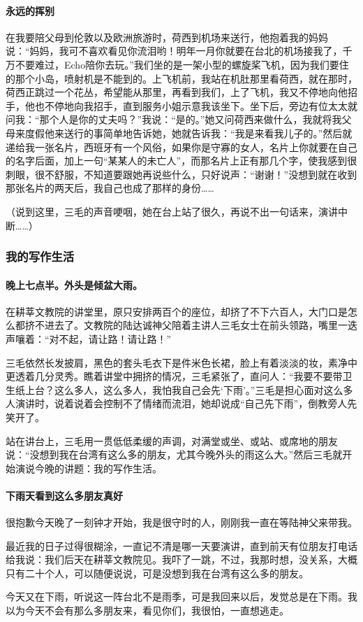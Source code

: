 \paragraph{永远的挥别}
\par 在我要陪父母到伦敦以及欧洲旅游时，荷西到机场来送行，他抱着我的妈妈说：“妈妈，我可不喜欢看见你流泪哟！明年一月你就要在台北的机场接我了，千万不要难过，Echo陪你去玩。”我们坐的是一架小型的螺旋桨飞机，因为我们要住的那个小岛，喷射机是不能到的。上飞机前，我站在机肚那里看荷西，就在那时，荷西正跳过一个花丛，希望能从那里，再看到我们，上了飞机，我又不停地向他招手，他也不停地向我招手，直到服务小姐示意我该坐下。坐下后，旁边有位太太就问我：“那个人是你的丈夫吗？”我说：“是的。”她又问荷西来做什么，我就将我父母来度假他来送行的事简单地告诉她，她就告诉我：“我是来看我儿子的。”然后就递给我一张名片，西班牙有一个风俗，如果你是守寡的女人，名片上你就要在自己的名字后面，加上一句“某某人的未亡人”，而那名片上正有那几个字，使我感到很刺眼，很不舒服，不知道要跟她再说些什么，只好说声：“谢谢！”没想到就在收到那张名片的两天后，我自己也成了那样的身份……
\par （说到这里，三毛的声音哽咽，她在台上站了很久，再说不出一句话来，演讲中断……）


\subsubsection{我的写作生活}


\paragraph*{晚上七点半。外头是倾盆大雨。}
\par 在耕莘文教院的讲堂里，原只安排两百个的座位，却挤了不下六百人，大门口是怎么都挤不进去了。文教院的陆达诚神父陪着主讲人三毛女士在前头领路，嘴里一迭声嚷着：“对不起，请让路！请让路！”
\par 三毛依然长发披肩，黑色的套头毛衣下是件米色长裙，脸上有着淡淡的妆，素净中更透着几分灵秀。瞧着讲堂中拥挤的情况，三毛紧张了，直问人：“我要不要带卫生纸上台？这么多人，这么多人，我怕我自己会先‘下雨’。”三毛是担心面对这么多人演讲时，说着说着会控制不了情绪而流泪，她却说成“自己先下雨”，倒教旁人先笑开了。
\par 站在讲台上，三毛用一贯低低柔缓的声调，对满堂或坐、或站、或席地的朋友说：“没想到我在台湾有这么多的朋友，尤其今晚外头的雨这么大。”然后三毛就开始演说今晚的讲题：我的写作生活。

\paragraph*{下雨天看到这么多朋友真好}
\par {}
\par 很抱歉今天晚了一刻钟才开始，我是很守时的人，刚刚我一直在等陆神父来带我。
\par 最近我的日子过得很糊涂，一直记不清是哪一天要演讲，直到前天有位朋友打电话给我说：我们后天在耕莘文教院见。我吓了一跳，不过，我那时想，没关系，大概只有二十个人，可以随便说说，可是没想到我在台湾有这么多的朋友。
\par 今天又在下雨，听说这一阵台北不是雨季，可是我回来以后，发觉总是在下雨。我以为今天不会有那么多朋友来，看见你们，我很怕，一直想逃走。


